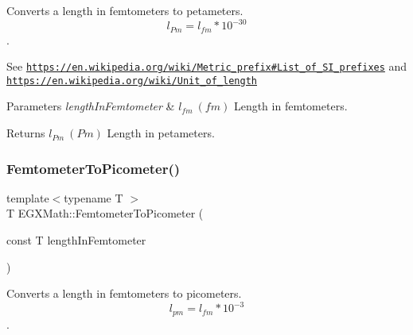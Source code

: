 Converts a length in femtometers to petameters. \[ l_{Pm}=l_{fm} * 10^{-30} \]. 

See \href{https://en.wikipedia.org/wiki/Metric_prefix#List_of_SI_prefixes}{\tt https\+://en.\+wikipedia.\+org/wiki/\+Metric\+\_\+prefix\#\+List\+\_\+of\+\_\+\+S\+I\+\_\+prefixes} and \href{https://en.wikipedia.org/wiki/Unit_of_length}{\tt https\+://en.\+wikipedia.\+org/wiki/\+Unit\+\_\+of\+\_\+length} 
\begin{DoxyParams}{Parameters}
{\em length\+In\+Femtometer} & $ l_{fm}\ (fm)$ Length in femtometers. \\
\hline
\end{DoxyParams}
\begin{DoxyReturn}{Returns}
$ l_{Pm}\ (Pm)$ Length in petameters. 
\end{DoxyReturn}
\mbox{\label{group___e_g_x_math-_conversions-_length_conversions-_femtometer-_s_i_gadfcd6b374d4134cad0ac1ce7a8e50509}} 
\subsubsection{\texorpdfstring{Femtometer\+To\+Picometer()}{FemtometerToPicometer()}}
{\footnotesize\ttfamily template$<$typename T $>$ \\
T E\+G\+X\+Math\+::\+Femtometer\+To\+Picometer (\begin{DoxyParamCaption}\item[{const T}]{length\+In\+Femtometer }\end{DoxyParamCaption})}



Converts a length in femtometers to picometers. \[ l_{pm}=l_{fm} * 10^{-3} \]. 

